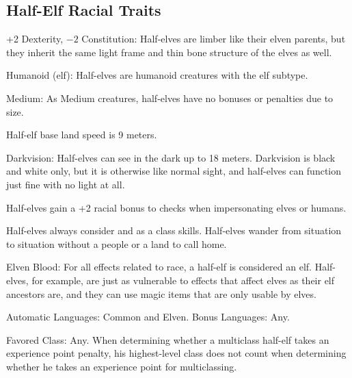 \subsection{Half-Elf Racial Traits}
\begin{itemize*}
    \item +2 Dexterity, $-2$ Constitution: Half-elves are limber like their elven parents, but they inherit the same light frame and thin bone structure of the elves as well.
    \item Humanoid (elf): Half-elves are humanoid creatures with the elf subtype.
    \item Medium: As Medium creatures, half-elves have no bonuses or penalties due to size.
    \item Half-elf base land speed is 9 meters.
    \item Darkvision: Half-elves can see in the dark up to 18 meters. Darkvision is black and white only, but it is otherwise like normal sight, and half-elves can function just fine with no light at all.
    \item Half-elves gain a +2 racial bonus to  checks when impersonating elves or humans.
    \item Half-elves always consider  and  as a class skills. Half-elves wander from situation to situation without a people or a land to call home.
    \item Elven Blood: For all effects related to race, a half-elf is considered an elf. Half-elves, for example, are just as vulnerable to effects that affect elves as their elf ancestors are, and they can use magic items that are only usable by elves.
    \item Automatic Languages: Common and Elven. Bonus Languages: Any.
    \item Favored Class: Any. When determining whether a multiclass half-elf takes an experience point penalty, his highest-level class does not count when determining whether he takes an experience point for multiclassing.
\end{itemize*}